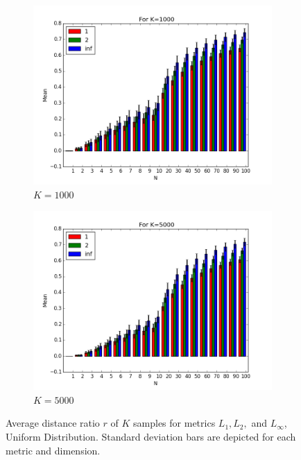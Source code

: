 \documentclass{article}
\begin{document}
\begin{figure}[H]
   \centering
   \ContinuedFloat 
    \begin{subfigure}[h]{0.75\textwidth}
        \includegraphics[width=\textwidth]{experiment1-1-1000.png}
        \caption{$K=1000$}
        \label{fig:exp1k1000}
    \end{subfigure}
    \begin{subfigure}[h]{0.75\textwidth}
        \includegraphics[width=\textwidth]{experiment1-1-5000.png}
        \caption{$K=5000$}
        \label{fig:exp11k5000}
    \end{subfigure}
    \caption{Average distance ratio $r$ of $K$ samples for metrics $L_1,L_2,$ and $L_{\infty}$, Uniform Distribution. Standard deviation bars are depicted for each metric and dimension.}\label{fig:exp11}
\end{figure}
\end{document}
